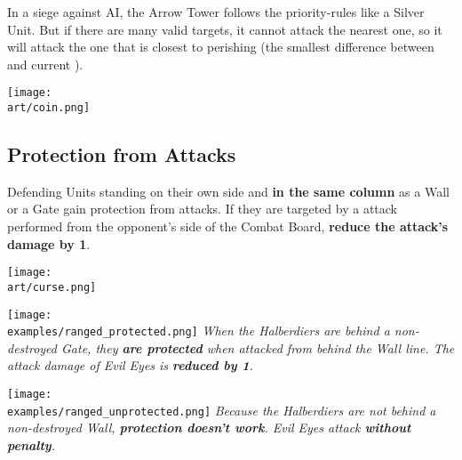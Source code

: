 \begin{multicols*}{2}
In a siege against AI, the Arrow Tower follows the priority-rules like a Silver  Unit. But if there are many valid targets, it cannot attack the nearest one, so it will attack the one that is closest to perishing (the smallest difference between  and current ).

\vspace*{\fill}
\begin{center}
  \texttt{[image: \\art/coin.png]}
\end{center}
\end{multicols*}

\newpage
\begin{multicols}{2}
\subsection*{Protection from  Attacks}

Defending Units standing on their own side and \textbf{in the same column} as a Wall or a Gate gain protection from  attacks.
If they are targeted by a  attack performed from the opponent's side of the Combat Board, \textbf{reduce the attack's damage by 1}.
\vspace*{\fill}

\begin{center}
  \texttt{[image: \\art/curse.png]}
\end{center}
\end{multicols}

\begin{multicols}{2}
\vspace*{\fill}
\texttt{[image: \\examples/ranged\_protected.png]}
{\textit{When the Halberdiers are behind a non-destroyed Gate, they \textbf{are protected} when attacked from behind the Wall line.
  The  attack damage of Evil Eyes is \textbf{reduced by 1}.}}
\columnbreak

\vspace*{\fill}
\texttt{[image: \\examples/ranged\_unprotected.png]}
{\textit{Because the Halberdiers are not behind a non-destroyed Wall, \textbf{protection doesn't work}.
  Evil Eyes attack \textbf{without penalty}.}}
\newline\newline
\end{multicols}
\newpage


